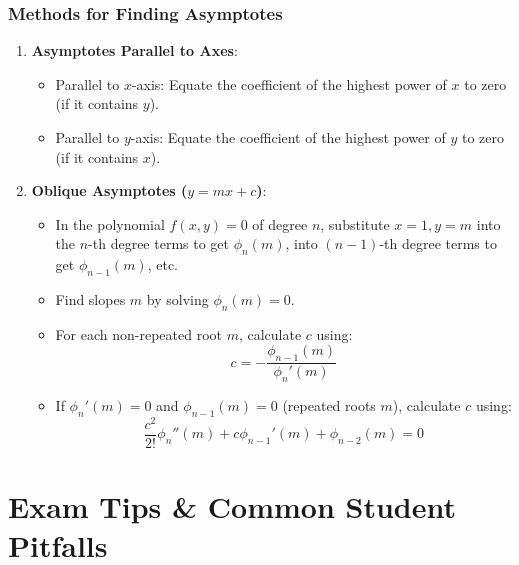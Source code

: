 \subsubsection{Methods for Finding Asymptotes}
\begin{enumerate}[leftmargin=1.5em]
    \item \textbf{Asymptotes Parallel to Axes}:
    \begin{itemize}
        \item Parallel to $x$-axis: Equate the coefficient of the highest power of $x$ to zero (if it contains $y$).
        \item Parallel to $y$-axis: Equate the coefficient of the highest power of $y$ to zero (if it contains $x$).
    \end{itemize}
    \item \textbf{Oblique Asymptotes ($y = mx + c$)}:
    \begin{itemize}
        \item In the polynomial $f(x,y) = 0$ of degree $n$, substitute $x = 1, y = m$ into the $n$-th degree terms to get $\phi_n(m)$, into $(n-1)$-th degree terms to get $\phi_{n-1}(m)$, etc.
        \item Find slopes $m$ by solving $\phi_n(m) = 0$.
        \item For each non-repeated root $m$, calculate $c$ using:
        \begin{equation}
            c = -\frac{\phi_{n-1}(m)}{\phi_n'(m)}
        \end{equation}
        \item If $\phi_n'(m) = 0$ and $\phi_{n-1}(m) = 0$ (repeated roots $m$), calculate $c$ using:
        \begin{equation}
            \frac{c^2}{2!} \phi_n''(m) + c \phi_{n-1}'(m) + \phi_{n-2}(m) = 0
        \end{equation}
    \end{itemize}
\end{enumerate}

\section{Exam Tips \& Common Student Pitfalls}

